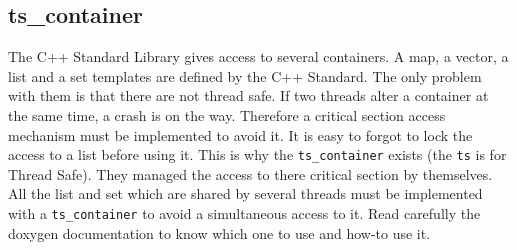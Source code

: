   \subsection{\textsf{ts\_container}}

  The C++ Standard Library gives access to several containers. A map, a vector, a
  list and a set templates are defined by the C++ Standard. The only problem with
  them is that there are not thread safe. If two threads alter a container at the
  same time, a crash is on the way. Therefore a critical section access mechanism
  must be implemented to avoid it. It is easy to forgot to lock the access to a
  list before using it. This is why the \texttt{ts\_container} exists (the
      \texttt{ts} is for Thread Safe). They managed the access to there critical
  section by themselves. All the list and set which are shared by several threads
  must be implemented with a \texttt{ts\_container} to avoid a simultaneous
  access to it. Read carefully the doxygen documentation to know which one to use
  and how-to use it.
